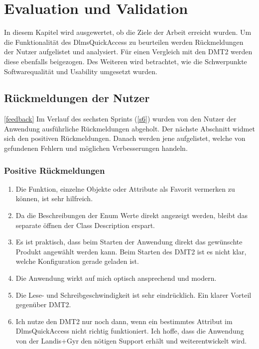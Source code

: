 
\chapter{Evaluation und Validation}\label{eval}
In diesem Kapitel wird ausgewertet, ob die Ziele der Arbeit erreicht wurden.
Um die Funktionalität des DlmsQuickAccess zu beurteilen werden Rückmeldungen der Nutzer aufgelistet und analysiert.
Für einen Vergleich mit den \ac{DMT2} werden diese ebenfalls beigezogen.
Des Weiteren wird betrachtet, wie die Schwerpunkte Softwarequalität und Usability umgesetzt wurden.



\section{Rückmeldungen der Nutzer}\ref{feedback}
Im Verlauf des sechsten Sprints (\ref{s6}) wurden von den Nutzer der Anwendung ausführliche Rückmeldungen abgeholt.
Der nächste Abschnitt widmet sich den positiven Rückmeldungen.
Danach werden jene aufgelistet, welche von gefundenen Fehlern und möglichen Verbesserungen handeln.
\subsection{Positive Rückmeldungen}

\begin{enumerate}
   \item Die Funktion, einzelne Objekte oder Attribute als Favorit vermerken zu können, ist sehr hilfreich.
   \item Da die Beschreibungen der Enum Werte direkt angezeigt werden, bleibt das separate öffnen der Class Description erspart.
   \item Es ist praktisch, dass beim Starten der Anwendung direkt das gewünschte Produkt angewählt werden kann. Beim Starten des \ac{DMT2} ist es nicht klar, welche Konfiguration gerade geladen ist.
   \item Die Anwendung wirkt auf mich optisch ansprechend und modern.
   \item Die Lese- und Schreibgeschwindigkeit ist sehr eindrücklich. Ein klarer Vorteil gegenüber \ac{DMT2}.
   \item Ich nutze den \ac{DMT2} nur noch dann, wenn ein bestimmtes Attribut im DlmsQuickAccess nicht richtig funktioniert. Ich hoffe, dass die Anwendung von der Landis+Gyr den nötigen Support erhält und weiterentwickelt wird.
\end{enumerate}


